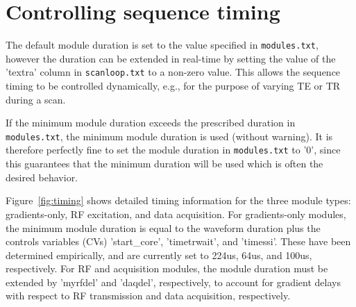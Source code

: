 
\chapter{Controlling sequence timing}
\label{ch:timing}

The default module duration is set to the value specified in \texttt{modules.txt}, however the duration can be extended in real-time by setting the value of the 'textra' column in {\tt scanloop.txt} to a non-zero value.
This allows the sequence timing to be controlled dynamically, e.g., for the purpose of varying TE or TR during a scan.

If the minimum module duration exceeds the prescribed duration in {\tt modules.txt}, the minimum module duration is used (without warning).
It is therefore perfectly fine to set the module duration in {\tt modules.txt} to '0', since this guarantees that the minimum duration will be used which is often the desired behavior.

Figure~\ref{fig:timing} shows detailed timing information for the three module types: gradients-only, RF excitation, and data acquisition.
For gradients-only modules, the minimum module duration is equal to the waveform duration plus the controls variables (CVs) 'start\_core', 'timetrwait', and 'timessi'.
These have been determined empirically, and are currently set to 224us, 64us, and 100us, respectively.
For RF and acquisition modules, the module duration must be extended by 'myrfdel' and 'daqdel', respectively, to account for gradient delays with respect to RF transmission and data acquisition, respectively.
%
%



